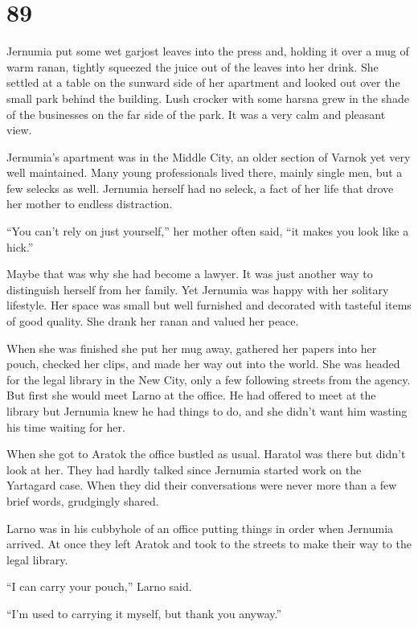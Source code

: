 
\chapter{89}

Jernumia put some wet garjost leaves into the press and, holding it over a mug of warm ranan,
tightly squeezed the juice out of the leaves into her drink. She settled at a table on the
sunward side of her apartment and looked out over the small park behind the building. Lush
crocker with some harsna grew in the shade of the businesses on the far side of the park. It was
a very calm and pleasant view.

Jernumia's apartment was in the Middle City, an older section of Varnok yet very well
maintained. Many young professionals lived there, mainly single men, but a few selecks as well.
Jernumia herself had no seleck, a fact of her life that drove her mother to endless distraction.

``You can't rely on just yourself,'' her mother often said, ``it makes you look like a hick.''

Maybe that was why she had become a lawyer. It was just another way to distinguish herself from
her family. Yet Jernumia was happy with her solitary lifestyle. Her space was small but well
furnished and decorated with tasteful items of good quality. She drank her ranan and valued her
peace.

When she was finished she put her mug away, gathered her papers into her pouch, checked her
clips, and made her way out into the world. She was headed for the legal library in the New
City, only a few following streets from the agency. But first she would meet Larno at the
office. He had offered to meet at the library but Jernumia knew he had things to do, and she
didn't want him wasting his time waiting for her.

When she got to Aratok the office bustled as usual. Haratol was there but didn't look at her.
They had hardly talked since Jernumia started work on the Yartagard case. When they did their
conversations were never more than a few brief words, grudgingly shared.

Larno was in his cubbyhole of an office putting things in order when Jernumia arrived. At once
they left Aratok and took to the streets to make their way to the legal library.

``I can carry your pouch,'' Larno said.

``I'm used to carrying it myself, but thank you anyway.''

